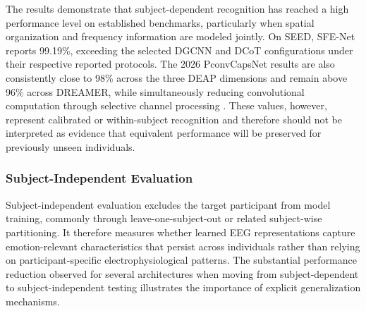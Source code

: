 \documentclass{WileyMSP-template}
\begin{document}
The results demonstrate that subject-dependent recognition has reached a high performance level on established benchmarks, particularly when spatial organization and frequency information are modeled jointly. On SEED, SFE-Net reports 99.19\%, exceeding the selected DGCNN and DCoT configurations under their respective reported protocols. The 2026 PconvCapsNet results are also consistently close to 98\% across the three DEAP dimensions and remain above 96\% across DREAMER, while simultaneously reducing convolutional computation through selective channel processing \cite{lin2026pconvcapsnet}. These values, however, represent calibrated or within-subject recognition and therefore should not be interpreted as evidence that equivalent performance will be preserved for previously unseen individuals.


\subsubsection{Subject-Independent Evaluation}
\label{subsubsec:subject_independent_evaluation}

Subject-independent evaluation excludes the target participant from model training, commonly through leave-one-subject-out or related subject-wise partitioning. It therefore measures whether learned EEG representations capture emotion-relevant characteristics that persist across individuals rather than relying on participant-specific electrophysiological patterns. The substantial performance reduction observed for several architectures when moving from subject-dependent to subject-independent testing illustrates the importance of explicit generalization mechanisms.
\end{document}
